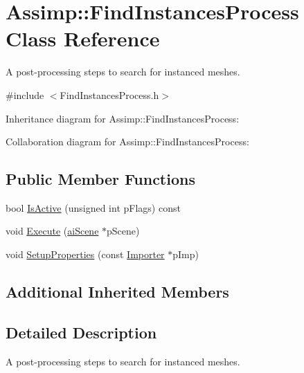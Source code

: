 \hypertarget{class_assimp_1_1_find_instances_process}{\section{Assimp\+:\+:Find\+Instances\+Process Class Reference}
\label{class_assimp_1_1_find_instances_process}
}


A post-\/processing steps to search for instanced meshes.  




{\ttfamily \#include $<$Find\+Instances\+Process.\+h$>$}



Inheritance diagram for Assimp\+:\+:Find\+Instances\+Process\+:


Collaboration diagram for Assimp\+:\+:Find\+Instances\+Process\+:
\subsection*{Public Member Functions}
\begin{DoxyCompactItemize}
\item 
bool \hyperlink{class_assimp_1_1_find_instances_process_ad855f92c69794327d7c41f3205d43f2f}{Is\+Active} (unsigned int p\+Flags) const 
\item 
void \hyperlink{class_assimp_1_1_find_instances_process_a48c1938052f1d9b12bf1d2b540d56540}{Execute} (\hyperlink{structai_scene}{ai\+Scene} $\ast$p\+Scene)
\item 
void \hyperlink{class_assimp_1_1_find_instances_process_a3359b0b3ce1dbc2a8370653a2420da73}{Setup\+Properties} (const \hyperlink{class_assimp_1_1_importer}{Importer} $\ast$p\+Imp)
\end{DoxyCompactItemize}
\subsection*{Additional Inherited Members}


\subsection{Detailed Description}
A post-\/processing steps to search for instanced meshes. 

